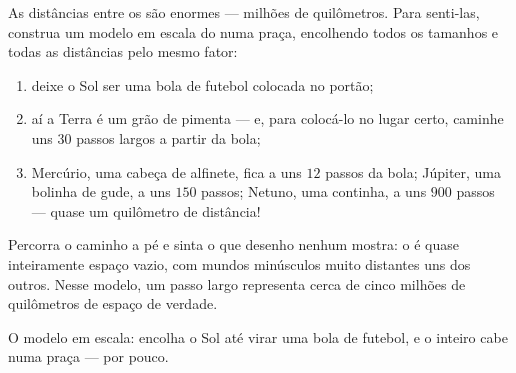 \begin{method}\label{met:g4:solar-system:model}
As distâncias entre os  são enormes --- milhões de
quilômetros. Para senti-las, construa um modelo em escala do  numa praça, encolhendo todos os tamanhos e todas as distâncias
pelo mesmo fator:
\begin{enumerate}
  \item deixe o Sol ser uma bola de futebol colocada no portão;
  \item aí a Terra é um grão de pimenta --- e, para colocá-lo no
        lugar certo, caminhe uns $30$ passos largos a partir da bola;
  \item Mercúrio, uma cabeça de alfinete, fica a uns $12$ passos da
        bola; Júpiter, uma bolinha de gude, a uns $150$ passos;
        Netuno, uma continha, a uns $900$ passos --- quase um
        quilômetro de distância!
\end{enumerate}
Percorra o caminho a pé e sinta o que desenho nenhum mostra: o
 é quase inteiramente espaço vazio, com mundos
minúsculos muito distantes uns dos outros. Nesse modelo, um passo
largo representa cerca de cinco milhões de quilômetros de espaço de
verdade.
\end{method}

\begin{omfigure}

{\small O modelo em escala: encolha o Sol até virar uma bola de
futebol, e o  inteiro cabe numa praça --- por pouco.}
\end{omfigure}

